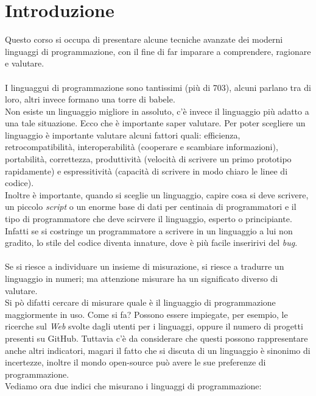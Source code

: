 \documentclass[10pt,a4paper]{book}
\begin{document}
\chapter{Introduzione}
Questo corso si occupa di presentare alcune tecniche avanzate dei moderni linguaggi di programmazione, con il fine di far imparare  a comprendere, ragionare e valutare.\\\\
I linguaggui di programmazione sono tantissimi (pi\`u di 703), alcuni parlano tra di loro, altri invece formano una torre di babele.\\
Non esiste un linguaggio migliore in assoluto, c'\`e invece il linguaggio pi\`u adatto a una tale situazione. Ecco che \`e importante saper valutare. Per poter scegliere un linguaggio \`e importante valutare alcuni fattori quali: efficienza, retrocompatibilit\`a, interoperabilit\`a (cooperare e scambiare informazioni), portabilit\`a, correttezza, produttivit\`a (velocit\`a di scrivere un primo prototipo rapidamente) e espressitivit\`a (capacit\`a di scrivere in modo chiaro le linee di codice).\\
Inoltre \`e importante, quando si sceglie un linguaggio, capire cosa si deve scrivere, un piccolo \textit{script} o un enorme base di dati per centinaia di programmatori e il tipo di programmatore che deve scirvere il linguaggio, esperto o principiante. Infatti se si costringe un programmatore a scrivere in un linguaggio a lui non gradito, lo stile del codice diventa innature, dove \`e pi\`u facile inseririvi del \textit{bug}.\\\\
Se si riesce a individuare un insieme di misurazione, si riesce a tradurre un linguaggio in numeri; ma attenzione misurare ha un significato diverso di valutare.\\
Si p\`o difatti cercare di misurare quale \`e il linguaggio di programmazione maggiormente in uso. Come si fa? Possono essere impiegate, per esempio, le ricerche sul \textit{Web} svolte dagli utenti per i linguaggi, oppure il numero di progetti presenti su GitHub. Tuttavia c'\`e da considerare che questi possono rappresentare anche altri indicatori, magari il fatto che si discuta di un linguaggio \`e sinonimo di incertezze, inoltre il mondo open-source pu\`o avere le sue preferenze di programmazione.\\
Vediamo ora due indici che misurano i linguaggi di programmazione:
\end{document}
